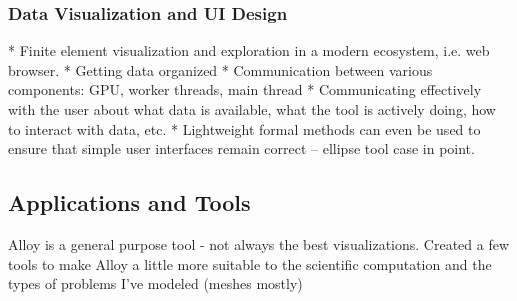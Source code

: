 \documentclass[../../proposal.tex]{subfiles}
\begin{document}
\subsubsection{Data Visualization and UI Design}

* Finite element visualization and exploration in a modern ecosystem, i.e. web browser.
* Getting data organized
* Communication between various components: GPU, worker threads, main thread
* Communicating effectively with the user about what data is available, what the tool is actively doing, how to interact with data, etc.
* Lightweight formal methods can even be used to ensure that simple user interfaces remain correct -- ellipse tool case in point.

\subsection{Applications and Tools}

Alloy is a general purpose tool - not always the best visualizations.
Created a few tools to make Alloy a little more suitable to the scientific computation and the types of problems I've modeled (meshes mostly)
\end{document}
